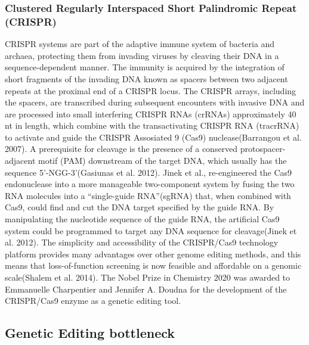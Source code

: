 \documentclass[
]{article}
\begin{document}
\hypertarget{clustered-regularly-interspaced-short-palindromic-repeat-crispr}{%
\subsubsection{Clustered Regularly Interspaced Short Palindromic Repeat
(CRISPR)}\label{clustered-regularly-interspaced-short-palindromic-repeat-crispr}}

CRISPR systems are part of the adaptive immune system of bacteria and
archaea, protecting them from invading viruses by cleaving their DNA in
a sequence-dependent manner. The immunity is acquired by the integration
of short fragments of the invading DNA known as spacers between two
adjacent repeats at the proximal end of a CRISPR locus. The CRISPR
arrays, including the spacers, are transcribed during subsequent
encounters with invasive DNA and are processed into small interfering
CRISPR RNAs (crRNAs) approximately 40 nt in length, which combine with
the transactivating CRISPR RNA (tracrRNA) to activate and guide the
CRISPR Assosiated 9 (Cas9) nuclease(Barrangou et al. 2007). A
prerequisite for cleavage is the presence of a conserved
protospacer-adjacent motif (PAM) downstream of the target DNA, which
usually has the sequence 5'-NGG-3'(Gasiunas et al. 2012). Jinek et al.,
re-engineered the Cas9 endonuclease into a more manageable two-component
system by fusing the two RNA molecules into a ``single-guide
RNA''(sgRNA) that, when combined with Cas9, could find and cut the DNA
target specified by the guide RNA. By manipulating the nucleotide
sequence of the guide RNA, the artificial Cas9 system could be
programmed to target any DNA sequence for cleavage(Jinek et al. 2012).
The simplicity and accessibility of the CRISPR/Cas9 technology platform
provides many advantages over other genome editing methods, and this
means that loss-of-function screening is now feasible and affordable on
a genomic scale(Shalem et al. 2014). The Nobel Prize in Chemistry 2020
was awarded to Emmanuelle Charpentier and Jennifer A. Doudna for the
development of the CRISPR/Cas9 enzyme as a genetic editing tool.

\hypertarget{genetic-editing-bottleneck}{%
\subsection{Genetic Editing
bottleneck}\label{genetic-editing-bottleneck}}
\end{document}
